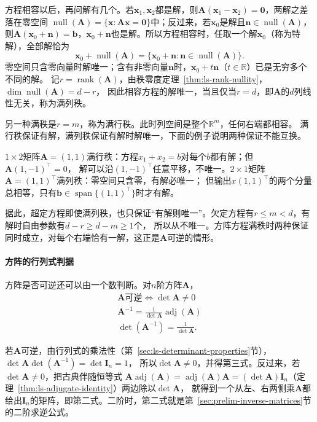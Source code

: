 方程相容以后，再问解有几个。若$\bm x_1,\bm x_2$都是解，则$\bm A(\bm x_1-\bm x_2)=\bm0$，两解之差落在零空间
$\operatorname{null}(\bm A)=\{\bm x:\bm A\bm x=\bm0\}$中；反过来，若$\bm x_0$是解且$\bm n\in\operatorname{null}(\bm A)$，
则$\bm A(\bm x_0+\bm n)=\bm b$，$\bm x_0+\bm n$也是解。所以方程相容时，任取一个解$\bm x_0$（称为特解），全部解恰为
\begin{equation}
 \bm x_0+\operatorname{null}(\bm A)=\{\bm x_0+\bm n:\bm n\in\operatorname{null}(\bm A)\}.
 \label{eq:ls-affine-solution-set}
\end{equation}
零空间只含零向量时解唯一；含有非零向量$\bm n$时，$\bm x_0+t\bm n$（$t\in\mathbb R$）已是无穷多个不同的解。
记$r=\operatorname{rank}(\bm A)$，由秩零度定理~\ref{thm:ls-rank-nullity}，$\dim\operatorname{null}(\bm A)=d-r$，
因此相容方程的解唯一，当且仅当$r=d$，即$\bm A$的$d$列线性无关，称为满列秩。

另一种满秩是$r=m$，称为满行秩。此时列空间是整个$\mathbb R^m$，任何右端都相容。
满行秩保证有解，满列秩保证有解时解唯一，下面的例子说明两种保证不能互换。

\begin{example}[反例：满行秩与满列秩互不蕴含]
\label{ex:ls-row-column-rank}
$1\times2$矩阵$\bm A=(1,1)$满行秩：方程$x_1+x_2=b$对每个$b$都有解；但$\bm A(1,-1)^\top=0$，
解可以沿$(1,-1)^\top$任意平移，不唯一。$2\times1$矩阵$\bm A=(1,1)^\top$满列秩：零空间只含零，有解必唯一；
但输出$x(1,1)^\top$的两个分量总相等，只有$\bm b\in\operatorname{span}\{(1,1)^\top\}$时才有解。
\end{example}

据此，超定方程即使满列秩，也只保证“有解则唯一”。欠定方程有$r\leq m<d$，有解时自由参数有$d-r\geq d-m\geq1$个，
所以从不唯一。方阵方程满秩时两种保证同时成立，对每个右端恰有一解，这正是$\bm A$可逆的情形。

\paragraph{方阵的行列式判据}
\label{sec:ls-determinant-invertibility}
方阵是否可逆还可以由一个数判断。对$n$阶方阵$\bm A$，
\[
\begin{gathered}
\bm A\text{可逆}\iff\det\bm A\neq0\\
\bm A^{-1}=\frac{1}{\det\bm A}\operatorname{adj}(\bm A)\\
\det(\bm A^{-1})=\frac{1}{\det\bm A}.
\end{gathered}
\]

若$\bm A$可逆，由行列式的乘法性（第~\ref{sec:ls-determinant-properties}节），$\det\bm A\det(\bm A^{-1})=\det\bm I_n=1$，
所以$\det\bm A\neq0$，并得第三式。反过来，若$\det\bm A\neq0$，把古典伴随恒等式
$\bm A\operatorname{adj}(\bm A)=\operatorname{adj}(\bm A)\bm A=(\det\bm A)\bm I_n$（定理~\ref{thm:ls-adjugate-identity}）两边除以$\det\bm A$，
就得到一个从左、右两侧乘$\bm A$都给出$\bm I_n$的矩阵，即第二式。二阶时，第二式就是第~\ref{sec:prelim-inverse-matrices}节的二阶求逆公式。

